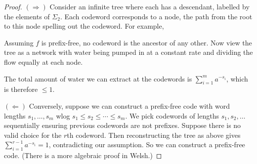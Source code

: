 \documentclass{article}
\begin{document}
\begin{proof}
    $(\Rightarrow)$ Consider an infinite tree where each has a descendant, labelled by the elements of $\Sigma_2$. Each codeword corresponds to a node, the path from the root to this node spelling out the codeword.
    For example,
    \begin{center}
    \end{center}
    Assuming $f$ is prefix-free, no codeword is the ancestor of any other. Now view the tree as a network with water being pumped in at a constant rate and dividing the flow equally at each node.

    The total amount of water we can extract at the codewords is $\sum_{i=1}^m a^{-s_i}$, which is therefore $\leq 1$.

    $(\Leftarrow)$ Conversely, suppose we can construct a prefix-free code with word lengths $s_1, \dotsc, s_m$ wlog $s_1 \leq s_2 \leq \dotsb \leq s_m$.
    We pick codewords of lengths $s_1, s_2, \dotsc$ sequentially ensuring previous codewords are not prefixes.
    Suppose there is no valid choice for the $r$th codeword.
    Then reconstructing the tree as above gives $ \sum_{i=1}^{r-1} a^{-s_i} = 1 $, contradicting our assumption.
    So we can construct a prefix-free code. (There is a more algebraic proof in Welsh.)
\end{proof}
\end{document}
